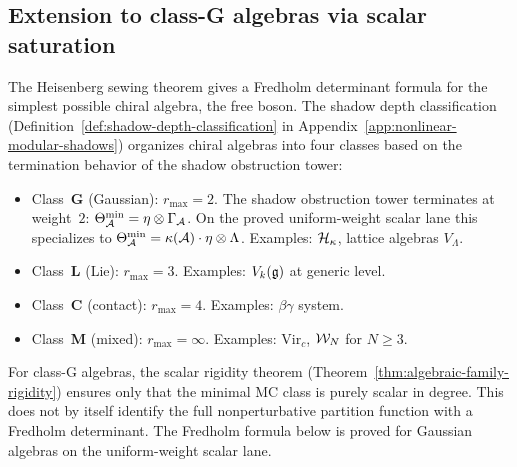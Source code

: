 %
%

\subsection{Extension to class-G algebras via scalar saturation}
\label{subsec:thqg-X-class-G}

The Heisenberg sewing theorem gives a Fredholm determinant
formula for the simplest possible chiral algebra, the free boson.
The shadow depth classification
(Definition~\ref{def:shadow-depth-classification}
in Appendix~\ref{app:nonlinear-modular-shadows})
organizes chiral algebras into four classes based on the
termination behavior of the shadow obstruction tower:
\begin{itemize}
\item Class~\textbf{G} (Gaussian): $r_{\max} = 2$.
 The shadow obstruction tower terminates at weight~$2$:
 $\Theta_{\mathcal{A}}^{\min} = \eta\otimes\Gamma_{\mathcal{A}}$.
 On the proved uniform-weight scalar lane this specializes to
 $\Theta_{\mathcal{A}}^{\min} = \kappa(\mathcal{A})\cdot\eta \otimes \Lambda$.
 Examples: $\mathcal{H}_\kappa$, lattice algebras $V_\Lambda$.
\item Class~\textbf{L} (Lie): $r_{\max} = 3$.
 Examples: $V_k(\mathfrak{g})$ at generic level.
\item Class~\textbf{C} (contact): $r_{\max} = 4$.
 Examples: $\beta\gamma$ system.
\item Class~\textbf{M} (mixed): $r_{\max} = \infty$.
 Examples: $\mathrm{Vir}_c$, $\mathcal{W}_N$ for $N \geq 3$.
\end{itemize}
For class-G algebras, the scalar rigidity theorem
(Theorem~\ref{thm:algebraic-family-rigidity}) ensures only that the
minimal MC class is purely scalar in degree. This does not by itself
identify the full nonperturbative partition function with a Fredholm
determinant. The Fredholm formula below is proved for Gaussian
algebras on the uniform-weight scalar lane.

